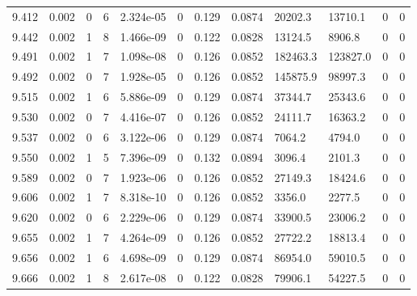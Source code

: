 \documentclass[preview]{standalone}
\begin{document}
{{{{{{{{{{{\begin{tabular}{L{1.2cm}C{1.2cm} C{0.3cm}C{0.5cm} C{1.4cm}C{1.4cm} C{1.4cm}C{1.4cm} C{1.6cm}C{1.6cm} C{1.6cm}C{1.6cm}}
  9.412  &  0.002  & 0     &  6 &  2.324e-05  & 0  &  0.129&   0.0874& 20202.3 & 13710.1   &  0 & 0  \\ 
  9.442  &  0.002  & 1     &  8 &  1.466e-09  & 0  &  0.122&   0.0828& 13124.5 & 8906.8   &  0 & 0  \\ 
  9.491  &  0.002  & 1     &  7 &  1.098e-08  & 0  &  0.126&   0.0852& 182463.3 & 123827.0   &  0 & 0  \\ 
  9.492  &  0.002  & 0     &  7 &  1.928e-05  & 0  &  0.126&   0.0852& 145875.9 & 98997.3   &  0 & 0  \\ 
  9.515  &  0.002  & 1     &  6 &  5.886e-09  & 0  &  0.129&   0.0874& 37344.7 & 25343.6   &  0 & 0  \\ 
  9.530  &  0.002  & 0     &  7 &  4.416e-07  & 0  &  0.126&   0.0852& 24111.7 & 16363.2   &  0 & 0  \\ 
  9.537  &  0.002  & 0     &  6 &  3.122e-06  & 0  &  0.129&   0.0874& 7064.2 & 4794.0   &  0 & 0  \\ 
  9.550  &  0.002  & 1     &  5 &  7.396e-09  & 0  &  0.132&   0.0894& 3096.4 & 2101.3   &  0 & 0  \\ 
  9.589  &  0.002  & 0     &  7 &  1.923e-06  & 0  &  0.126&   0.0852& 27149.3 & 18424.6   &  0 & 0  \\ 
  9.606  &  0.002  & 1     &  7 &  8.318e-10  & 0  &  0.126&   0.0852& 3356.0 & 2277.5   &  0 & 0  \\ 
  9.620  &  0.002  & 0     &  6 &  2.229e-06  & 0  &  0.129&   0.0874& 33900.5 & 23006.2   &  0 & 0  \\ 
  9.655  &  0.002  & 1     &  7 &  4.264e-09  & 0  &  0.126&   0.0852& 27722.2 & 18813.4   &  0 & 0  \\ 
  9.656  &  0.002  & 1     &  6 &  4.698e-09  & 0  &  0.129&   0.0874& 86954.0 & 59010.5   &  0 & 0  \\ 
  9.666  &  0.002  & 1     &  8 &  2.617e-08  & 0  &  0.122&   0.0828& 79906.1 & 54227.5   &  0 & 0  \\ 
\hline 
\end{tabular} 

}}}}}}}}}}}
\end{document}
